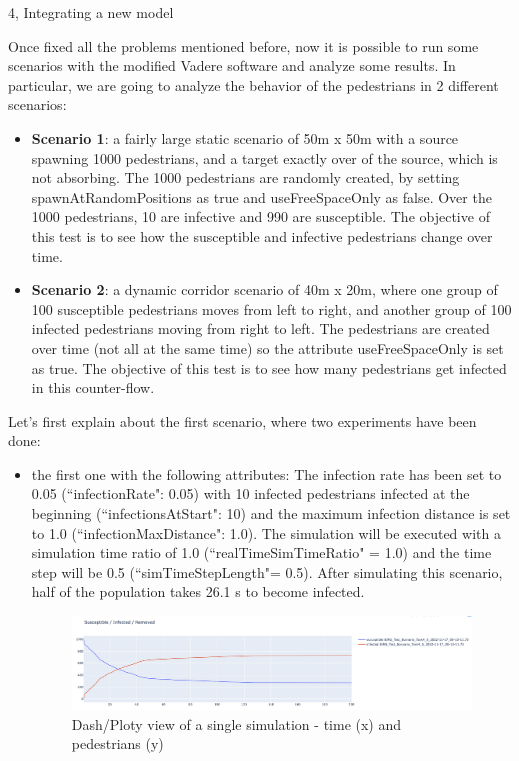 \documentclass[10pt,a4paper]{article}
\begin{document}
\begin{task}{4, Integrating a new model}
\newpage


Once fixed all the problems mentioned before, now it is possible to run some scenarios with the modified Vadere software and analyze some results. In particular, we are going to analyze the behavior of the pedestrians in 2 different scenarios:
    \begin{itemize}
        \item \textbf{Scenario 1}: a fairly large static scenario of 50m x 50m with a source spawning 1000 pedestrians, and a target exactly over of the source, which is not absorbing. The 1000 pedestrians are randomly created, by setting spawnAtRandomPositions as true and useFreeSpaceOnly as false. Over the 1000 pedestrians, 10 are infective and 990 are susceptible. The objective of this test is to see how the susceptible and infective pedestrians change over time.
        \item \textbf{Scenario 2}: a dynamic corridor scenario of 40m x 20m, where one group of 100 susceptible pedestrians moves from left to right, and another group of 100 infected pedestrians moving from right to left. The pedestrians are created over time (not all at the same time) so the attribute useFreeSpaceOnly is set as true. The objective of this test is to see how many pedestrians get infected in this counter-flow.
    \end{itemize}

Let's first explain about the first scenario, where two experiments have been done:
    \begin{itemize}
        \item the first one with the following attributes: The infection rate has been set to 0.05 (``infectionRate": 0.05) with 10 infected pedestrians infected at the beginning (``infectionsAtStart": 10) and the maximum infection distance is set to 1.0 (``infectionMaxDistance": 1.0). The simulation will be executed with a simulation time ratio of 1.0 (``realTimeSimTimeRatio" = 1.0) and the time step will be 0.5 (``simTimeStepLength"= 0.5).
        After simulating this scenario, half of the population takes 26.1 s to become infected.

        \begin{figure} [H]
            \includegraphics[width=15cm]{images/plot1.png}
            \centering
            \caption{Dash/Ploty view of a single simulation - time (x) and pedestrians (y)}
            \label{plot1}
        \end{figure}
        

\end{itemize}
\end{task}
\end{document}
